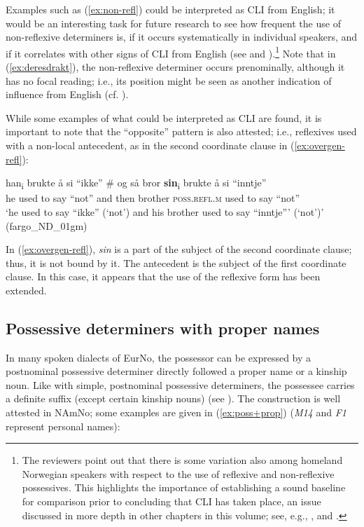 \documentclass[output=paper,colorlinks,citecolor=brown]{langscibook}
\begin{document}
\noindent Examples such as (\ref{ex:non-refl}) could be interpreted as CLI from English; it would be an interesting task for future research to see how frequent the use of non-reflexive determiners is, if it occurs systematically in individual speakers, and if it correlates with other signs of CLI from English (see \citealt{anderssenetal2018cross-linguistic} and \citealt{lundquistetal2020}).\footnote{The reviewers point out that there is some variation also among homeland Norwegian speakers with respect to the use of reflexive and non-reflexive possessives. This highlights the importance of establishing a sound baseline for comparison prior to concluding that CLI has taken place, an issue discussed in more depth in other chapters in this volume; see, e.g., ,  and .} Note that in (\ref{ex:deresdrakt}), the non-reflexive determiner occurs prenominally, although it has no focal reading; i.e., its position might be seen as another indication of influence from English (cf. ).

While some examples of what could be interpreted as CLI are found, it is important to note that the ``opposite'' pattern is also attested; i.e., reflexives used with a non-local antecedent, as in the second coordinate clause in (\ref{ex:overgen-refl}): 


\ea \label{ex:overgen-refl} \gll han\textsubscript{i} brukte å si ``ikke'' \# og så bror \textbf{sin}\textsubscript{i} brukte å si ``inntje'' \\
he used to say ``not'' {} and then brother \textsc{poss.refl.m} used to say ``not'' \\
\glt `he used to say ``ikke'' (`not') and his brother used to say ``inntje''' (`not')' (fargo\_ND\_01gm) \\ 
\z 

\noindent In (\ref{ex:overgen-refl}), \emph{sin} is a part of the subject of the second coordinate clause; thus, it is not bound by it. The antecedent is the subject of the first coordinate clause. In this case, it appears that the use of the reflexive form has been extended. 


\subsection{Possessive determiners with proper names}\label{subsec:poss+prop}
In many spoken dialects of EurNo, the possessor can be expressed by a postnominal possessive determiner directly followed a proper name or a kinship noun. Like with simple, postnominal possessive determiners, the possessee carries a definite suffix (except certain kinship nouns) (see ). The construction is well attested in NAmNo; some examples are given in (\ref{ex:poss+prop}) (\emph{M14} and \emph{F1} represent personal names):
\end{document}
